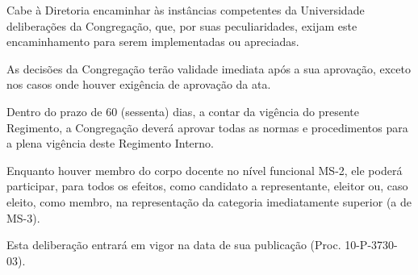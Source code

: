 \documentclass{documento}
\begin{document}
\artigo Cabe à Diretoria encaminhar às instâncias competentes da Universidade deliberações da Congregação, que, por suas peculiaridades, exijam este encaminhamento para serem implementadas ou apreciadas.

\artigo As decisões da Congregação terão validade imediata após a sua aprovação, exceto nos casos onde houver exigência de aprovação da ata.


\artigo Dentro do prazo de 60 (sessenta) dias, a contar da vigência do presente Regimento, a Congregação deverá aprovar todas as normas e procedimentos para a plena vigência deste Regimento Interno.

\artigo Enquanto houver membro do corpo docente no nível funcional MS-2, ele poderá participar, para todos os efeitos, como candidato a representante, eleitor ou, caso eleito, como membro, na representação da categoria imediatamente superior (a de MS-3).

\artigo Esta deliberação entrará em vigor na data de sua publicação (Proc. 10-P-3730-03).
\end{document}
